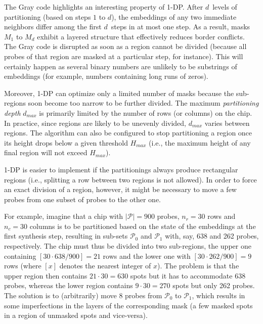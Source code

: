 The Gray code highlights an interesting property of 1-DP. After $d$~levels of
partitioning (based on steps $1$ to $d$), the embeddings of any two immediate
neighbors differ among the first $d$~steps in at most one step.  As a result,
masks $M_1$ to $M_d$ exhibit a layered structure that effectively reduces
border conflicts. The Gray code is disrupted as soon as a region cannot be
divided (because all probes of that region are masked at a particular step,
for instance). This will certainly happen as several binary numbers are unlikely
to be substrings of embeddings (for example, numbers containing long runs of
zeros).

Moreover, 1-DP can optimize only a limited number of masks because the
sub-regions soon become too narrow to be further divided. The maximum
\emph{partitioning depth} $d_{max}$ is primarily limited by the number of rows
(or columns) on the chip. In practice, since regions are likely to be unevenly
divided, $d_{max}$ varies between regions. The algorithm can also be configured
to stop partitioning a region once its height drops below a given threshold
$H_{max}$ (i.e., the maximum height of any final region will not exceed
$H_{max}$).

1-DP is easier to implement if the partitionings always produce rectangular
regions (i.e., splitting a row between two regions is not allowed). In order to
force an exact division of a region, however, it might be necessary to move a
few probes from one subset of probes to the other one.

For example, imagine that a chip with $|\mathcal{P}| = 900$ probes, $n_r = 30$
rows and $n_c = 30$ columns is to be partitioned based on the state of the
embeddings at the first synthesis step, resulting in sub-sets $\mathcal{P}_0$
and $\mathcal{P}_1$ with, say, 638 and 262 probes, respectively. The chip must
thus be divided into two sub-regions, the upper one containing
$[30 \cdot 638/900]=21$ rows and the lower one with $[30 \cdot 262/900]=9$ rows
(where $[x]$ denotes the nearest integer of $x$). The problem is that the upper
region then contains $21 \cdot 30 = 630$ spots but it has to accommodate 638
probes, whereas the lower region contains $9 \cdot 30 = 270$ spots but only 262
probes. The solution is to (arbitrarily) move 8 probes from $\mathcal{P}_0$ to
$\mathcal{P}_1$, which results in some imperfections in the layers of the
corresponding mask (a few masked spots in a region of unmasked spots and
vice-versa).

